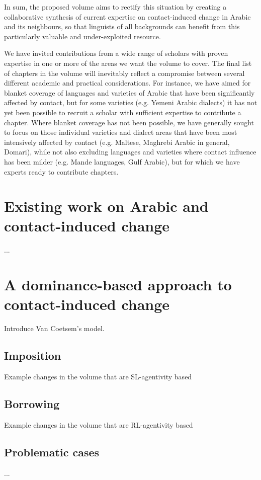 \documentclass[output=paper]{langsci/langscibook}
\begin{document}
In sum, the proposed volume aims to rectify this situation by creating a collaborative synthesis of current expertise on contact-induced change in Arabic and its neighbours, so that linguists of all backgrounds can benefit from this particularly valuable and under-exploited resource.

We have invited contributions from a wide range of scholars with proven expertise in one or more of the areas we want the volume to cover. The final list of chapters in the volume will inevitably reflect a compromise between several different academic and practical considerations. For instance, we have aimed for blanket coverage of languages and varieties of Arabic that have been significantly affected by contact, but for some varieties (e.g. Yemeni Arabic dialects) it has not yet been possible to recruit a scholar with sufficient expertise to contribute a chapter. Where blanket coverage has not been possible, we have generally sought to focus on those individual varieties and dialect areas that have been most intensively affected by contact (e.g. Maltese, Maghrebi Arabic in general, Domari), while not also excluding languages and varieties where contact influence has been milder (e.g. Mande languages, Gulf Arabic), but for which we have experts ready to contribute chapters.




\section{Existing work on Arabic and contact-induced change}
...

\section{A dominance-based approach to contact-induced change}
Introduce Van Coetsem's model.

\subsection{Imposition}
Example changes in the volume that are SL-agentivity based

\subsection{Borrowing}
Example changes in the volume that are RL-agentivity based

\subsection{Problematic cases}
...
\end{document}
